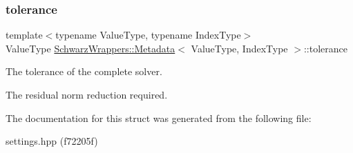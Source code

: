 \subsubsection{\texorpdfstring{tolerance}{tolerance}}
{\footnotesize\ttfamily template$<$typename Value\+Type, typename Index\+Type$>$ \\
Value\+Type \hyperlink{structSchwarzWrappers_1_1Metadata}{Schwarz\+Wrappers\+::\+Metadata}$<$ Value\+Type, Index\+Type $>$\+::tolerance}



The tolerance of the complete solver. 

The residual norm reduction required. 

The documentation for this struct was generated from the following file\+:\begin{DoxyCompactItemize}
\item 
settings.\+hpp (f72205f)\end{DoxyCompactItemize}
